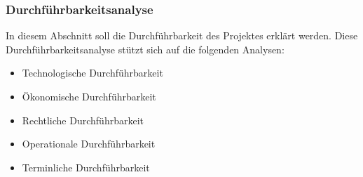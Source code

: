 \subsubsection{Durchführbarkeitsanalyse}
In diesem Abschnitt soll die Durchführbarkeit des Projektes erklärt werden. Diese Durchführbarkeitsanalyse stützt sich auf die folgenden Analysen:
\begin{itemize}
	\item Technologische Durchführbarkeit
	\item  Ökonomische Durchführbarkeit
	\item Rechtliche Durchführbarkeit
	\item  Operationale Durchführbarkeit
	\item  Terminliche Durchführbarkeit
\end{itemize}

